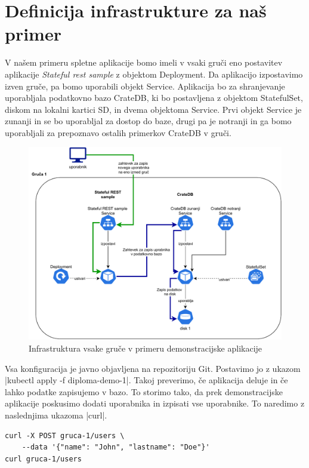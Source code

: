 \documentclass[a4paper, 12pt]{book}
\begin{document}
\section{Definicija infrastrukture za naš primer}
V našem primeru spletne aplikacije bomo imeli v vsaki gruči eno postavitev aplikacije \emph{Stateful rest sample} z objektom Deployment. 
Da aplikacijo izpostavimo izven gruče, pa bomo uporabili objekt Service.
Aplikacija bo za shranjevanje uporabljala podatkovno bazo CrateDB, ki bo postavljena z objektom StatefulSet, diskom na lokalni kartici SD, in dvema objektoma Service.
Prvi objekt Service je zunanji in se bo uporabljal za dostop do baze, drugi pa je notranji in ga bomo uporabljali za prepoznavo ostalih primerkov CrateDB v gruči.
\begin{figure}[h]
\begin{center}
\includegraphics[width=1.0\textwidth]{images/infrastructure-example.pdf}
\end{center}
\caption{Infrastruktura vsake gruče v primeru demonstracijske aplikacije}
\label{infrastructure-example}
\end{figure}
Vsa konfiguracija je javno objavljena na repozitoriju Git\cite{git-diploma}.
Postavimo jo z ukazom \spverb|kubectl apply -f diploma-demo-1|.
Takoj preverimo, če aplikacija deluje in če lahko podatke zapisujemo v bazo.
To storimo tako, da prek demonstracijske aplikacije poskusimo dodati uporabnika in izpisati vse uporabnike.
To naredimo z naslednjima ukazoma \spverb|curl|.
\begin{verbatim}
curl -X POST gruca-1/users \
    --data '{"name": "John", "lastname": "Doe"}'
curl gruca-1/users
\end{verbatim}
\end{document}
